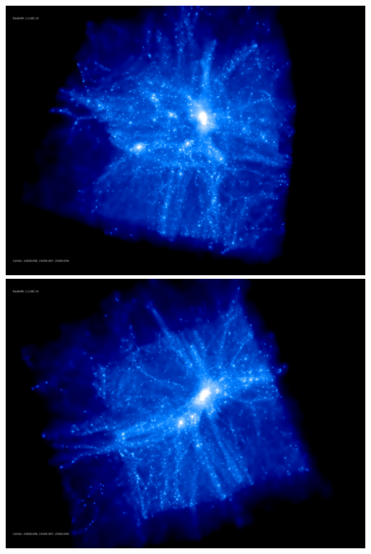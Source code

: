\includegraphics[scale=0.1]{stages_21/rotate_00074.jpg} 
\includegraphics[scale=0.1]{stages_21/rotate_00131.jpg}  \\

